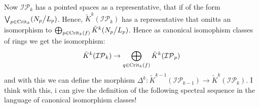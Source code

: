 \begin{remark}
	Now $\mathcal{IP}_k$ has a pointed spaces as a representative, that if of the form $\bigvee_{p\in \mathrm{Crit}_k}(N_p\big/L_p)$. Hence, $\tilde{K}^k(\mathcal{IP}_k)$ has a representative that omitts an isomorphism to $\bigoplus_{p\in \mathrm{Crit}_k(f)}\tilde{K}^k(N_p\big/L_p)$. Hence as canonical isomophism classes of rings we get the isomorphism:
	\begin{equation*}
		\tilde{K}^k(\mathcal{IP}_k)\to \bigoplus_{q\in \mathrm{Crit}_k(f)}\tilde{K}^k(\mathcal{IP}_p)
	\end{equation*} and with this we can define the morphism $\underline{\Delta^k}:	\tilde{K}^{k-1}(\mathcal{IP}_{k-1})\to 	\tilde{K}^k(\mathcal{IP}_k)$.
	I think with this, i can give the definition of the following spectral sequence in the language of canonical isomorphism classes!
\end{remark}



